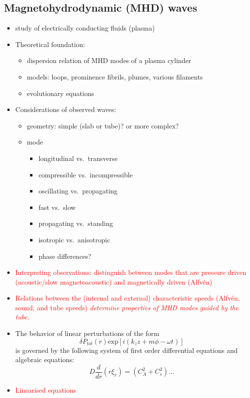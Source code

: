 \documentclass{article}
\begin{document}
\subsection{Magnetohydrodynamic (MHD) waves}
\begin{itemize}
    \item study of electrically conducting fluids (plasma)
    \item Theoretical foundation:
        \begin{itemize}
            \item dispersion relation of MHD modes of a plasma cylinder
            \item models: loops, prominence fibrils, plumes, various filaments
            \item evolutionary equations
        \end{itemize}
    \item Considerations of observed waves:
        \begin{itemize}
            \item geometry: simple (slab or tube)? or more complex?
            \item mode
                \begin{itemize}
                    \item longitudinal vs.\ transverse
                    \item compressible vs.\ incompressible
                    \item oscillating vs.\ propagating
                    \item fast vs.\ slow
                    \item propagating vs.\ standing
                    \item isotropic vs.\ anisotropic
                    \item phase differences?
                \end{itemize}
        \end{itemize}
    \item \textcolor{red}{Interpreting observations: distinguish between modes
        that are pressure driven (acoustic/slow magnetoacoustic)
        and magnetically driven (Alfv\'en)}
    \item \textcolor{red}{Relations between the (internal and external)
        characteristic speeds (Alfv\'en, sound, and tube speeds)
        \emph{determine properties of MHD modes guided by the tube.}}
    \item The behavior of linear perturbations of the form
        $$ \delta P_{tot}(r)\textrm{exp}\left[i(k_zz+m\phi-\omega t)\right]  $$
        is governed by  the following system of first order differential
        equations and algebraic equations:
        $$ D\frac{d}{dr}(r\xi_r) = (C_A^2+C_s^2)\ldots  $$
    \item \textcolor{red}{Linearised equations}


\end{itemize}
\end{document}
